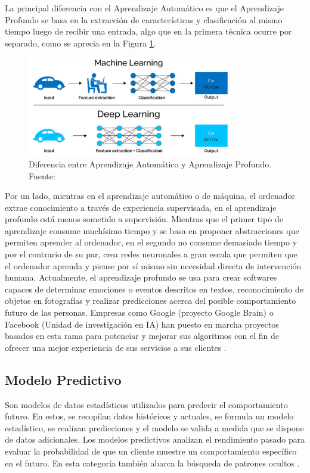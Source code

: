 La principal diferencia con el Aprendizaje Automático es que el Aprendizaje Profundo se basa en la extracción de características y clasificación al mismo tiempo luego de recibir una entrada, algo que en la primera técnica ocurre por separado, como se aprecia en la Figura \ref{2:fig6}.
\begin{figure}[h]
	\begin{center}
		\includegraphics[width=0.8\textwidth]{2/figures/deeplearning_machinelearning.jpg}
		\caption{Diferencia entre Aprendizaje Automático y Aprendizaje Profundo. Fuente: \cite{tec_cook2018deeplearning}}
		\label{2:fig6}
	\end{center}
\end{figure}

Por un lado, mientras en el aprendizaje automático o de máquina, el ordenador extrae conocimiento a través de experiencia supervisada, en el aprendizaje profundo está menos sometido a supervisión. Mientras que el primer tipo de aprendizaje consume muchísimo tiempo y se basa en proponer abstracciones que permiten aprender al ordenador, en el segundo no consume demasiado tiempo y por el contrario de su par, crea redes neuronales a gran escala que permiten que el ordenador aprenda y piense por sí mismo sin necesidad directa de intervención humana. Actualmente, el aprendizaje profundo se usa para crear softwares capaces de determinar emociones o eventos descritos en textos, reconocimiento de objetos en fotografías y realizar predicciones acerca del posible comportamiento futuro de las personas. Empresas como Google (proyecto Google Brain) o Facebook (Unidad de investigación en IA) han puesto en marcha proyectos basados en esta rama para potenciar y mejorar sus algoritmos con el fin de ofrecer una mejor experiencia de sus servicios a sus clientes \parencite{tec_banafa2019deeplearning}.

\subsection{Modelo Predictivo}
Son modelos de datos estadísticos utilizados para predecir el comportamiento futuro. En estos, se recopilan datos históricos y actuales, se formula un modelo estadístico, se realizan predicciones y el modelo se valida a medida que se dispone de datos adicionales. Los modelos predictivos analizan el rendimiento pasado para evaluar la probabilidad de que un cliente muestre un comportamiento específico en el futuro. En esta categoría también abarca la búsqueda de patrones ocultos \parencite{gl_gartner2019pm}.

